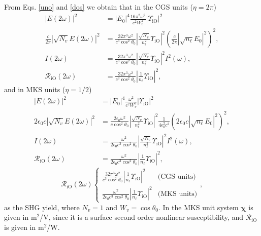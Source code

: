 From Eqs. \eqref{uno} and \eqref{dos} we obtain that
in the CGS units ($\eta=2\pi$)
\begin{align}\label{r01}
|E(2\omega)|^2 
&= |E_{0}|^4\frac{16\pi^{2}\omega^{2}}{c^{2}W^2_v}
\left\vert  
\Upsilon_{\mathrm{iO}}
\right\vert^{2}
\nonumber\\
\frac{c}{2\pi}|\sqrt{N_v}E(2\omega)|^{2} 
&=
\frac{32\pi^{3}\omega^{2}}{c^{3}\cos^2\theta_{0}}
\left\vert  
\frac{\sqrt{N_v}}{n^2_\ell}
\Upsilon_{\mathrm{iO}}
\right\vert^{2} 
\left(\frac{c}{2\pi}|\sqrt{n_\ell}E_{0}|^{2}\right)^{2},
\nonumber\\ 
I(2\omega) 
&= \frac{32\pi^{3}\omega^{2}}{c^{3}\cos^2\theta_{0}}
\left\vert  
\frac{\sqrt{N_v}}{n^2_\ell}
\Upsilon_{\mathrm{iO}}
\right\vert^{2}I^{2}(\omega),
\nonumber\\
\mathcal{R}_{\mathrm{iO}}(2\omega) 
&= 
\frac{32\pi^{3}\omega^{2}}{c^{3}\cos^2\theta_{0}}
\left\vert  
\frac{1}{n_\ell}
\Upsilon_{\mathrm{iO}}
\right\vert^{2}
,
\end{align} 
and in MKS units ($\eta=1/2$)
\begin{align}\label{r01m}
|E(2\omega)|^2 
&= |E_{0}|^4
\frac{\omega^{2}}{c^{2}W^2_v}
\left\vert  
\Upsilon_{\mathrm{iO}}
\right\vert^{2}
\nonumber\\
2\epsilon_{0}c|\sqrt{N_v}E(2\omega)|^{2} 
&=
\frac{2\epsilon_{0}\omega^{2}}{c\cos^2\theta_{0}}
\left\vert  
\frac{\sqrt{N_v}}{n^2_\ell}
\Upsilon_{\mathrm{iO}}
\right\vert^{2} 
\frac{1}{4\epsilon^2_0c^2}\left(2\epsilon_{0}c|\sqrt{n_\ell}E_{0}|^{2}\right)^{2},
\nonumber\\ 
I(2\omega) 
&= 
\frac{\omega^{2}}{2\epsilon_{0}c^3\cos^2\theta_{0}}
\left\vert  
\frac{\sqrt{N_v}}{n^2_\ell}
\Upsilon_{\mathrm{iO}}
\right\vert^{2}I^{2}(\omega),
\nonumber\\
\mathcal{R}_{\mathrm{iO}}(2\omega) 
&= \frac{\omega^{2}}{2\epsilon_{0}c^3\cos^2\theta_{0}}
\left\vert  
\frac{1}{n_\ell}
\Upsilon_{\mathrm{iO}}
\right\vert^{2} 
,
\end{align} 
\begin{equation}\label{mc6}
\mathcal{R}_{\mathrm{iO}}(2\omega) 
\left\{
\begin{array}{cc} 
\frac{32\pi^{3}\omega^{2}}{c^{3}\cos^2\theta_{0}}
\left\vert  
\frac{1}{n_\ell}
\Upsilon_{\mathrm{iO}}
\right\vert^{2} 
& \text{(CGS units)} \\
\frac{\omega^{2}}{2\epsilon_{0}c^3\cos^2\theta_{0}}
\left\vert  
\frac{1}{n_\ell}
\Upsilon_{\mathrm{iO}}
\right\vert^{2} 
& \text{(MKS units)} 
\end{array}
\right.
,
\end{equation}
as the SHG yield, where $N_v=1$ and $W_v=\cos\theta_{0}$.
In the MKS unit system $\boldsymbol{\chi}$ is given in m$^2$/V, since
it is a surface second order nonlinear susceptibility, and
$\mathcal{R}_{\mathrm{iO}}$ is given in m$^2$/W. 


